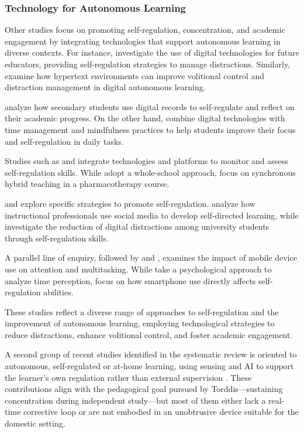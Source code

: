 \subsubsection{Technology for Autonomous Learning}
Other studies focus on promoting self-regulation, concentration, and academic engagement by integrating technologies that support autonomous learning in diverse contexts. For instance, \cite{Bembich2016Future} investigate the use of digital technologies for future educators, providing self-regulation strategies to manage distractions. Similarly, \cite{Peters2003Self} examine how hypertext environments can improve volitional control and distraction management in digital autonomous learning.

\cite{Roberts2020Task} analyze how secondary students use digital records to self-regulate and reflect on their academic progress. On the other hand, \cite{Adcroft2018Developing} combine digital technologies with time management and mindfulness practices to help students improve their focus and self-regulation in daily tasks.

Studies such as \cite{Salter2014Exploring} and \cite{Palmer2022impact} integrate technologies and platforms to monitor and assess self-regulation skills. While \cite{Salter2014Exploring} adopt a whole-school approach, \cite{Palmer2022impact} focus on synchronous hybrid teaching in a pharmacotherapy course.

\cite{Muljana2022Instructional} and \cite{Wang2022Empowering} explore specific strategies to promote self-regulation. \cite{Muljana2022Instructional} analyze how instructional professionals use social media to develop self-directed learning, while \cite{Wang2022Empowering} investigate the reduction of digital distractions among university students through self-regulation skills.

A parallel line of enquiry, followed by \cite{Hartley2022Smartphone} and \cite{Labar2019Interplay}, examines the impact of mobile device use on attention and multitasking. While \cite{Labar2019Interplay} take a psychological approach to analyze time perception, \cite{Hartley2022Smartphone} focus on how smartphone use directly affects self-regulation abilities.

These studies reflect a diverse range of approaches to self-regulation and the improvement of autonomous learning, employing technological strategies to reduce distractions, enhance volitional control, and foster academic engagement.

A second group of recent studies identified in the systematic review is oriented to autonomous, self-regulated or at-home learning, using sensing and AI to support the learner's own regulation rather than external supervision \citep{Huang2021Student, Chen2023Mirrorus, Lathaharan2023Transforming}. These contributions align with the pedagogical goal pursued by Torddis---sustaining concentration during independent study---but most of them either lack a real-time corrective loop or are not embodied in an unobtrusive device suitable for the domestic setting.

